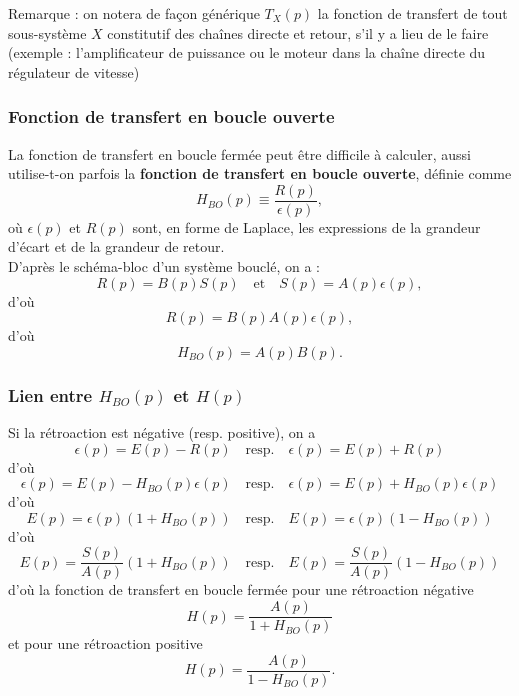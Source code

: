 \documentclass[11pt,a4paper]{report}
\begin{document}
Remarque : on notera de façon générique $T_X(p)$ la fonction de transfert de tout sous-système $X$ constitutif des chaînes directe et retour, s'il y a lieu de le faire (exemple : l'amplificateur de puissance ou le moteur dans la chaîne directe du régulateur de vitesse)

\subsubsection{Fonction de transfert en boucle ouverte}

La fonction de transfert en boucle fermée peut être difficile à calculer, aussi utilise-t-on parfois la \textbf{fonction de transfert en boucle ouverte}, définie comme
\begin{equation}
	H_{BO}(p) \equiv \frac{R(p)}{\epsilon(p)},
\end{equation}
où $\epsilon(p)$ et $R(p)$ sont, en forme de Laplace, les expressions de la grandeur d'écart et de la grandeur de retour.\\

D'après le schéma-bloc d'un système bouclé, on a :
\begin{equation}
	R(p) = B(p)S(p) \quad \text{et} \quad S(p) = A(p)\epsilon(p),
\end{equation}
d'où
\begin{equation}
	R(p) = B(p)A(p)\epsilon(p),
\end{equation}
d'où 
\begin{equation}
	 \boxed{H_{BO}(p) = A(p)B(p)}. 
\end{equation}

\subsubsection{Lien entre $H_{BO}(p)$ et $H(p)$}

Si la rétroaction est négative (resp. positive), on a 
\begin{equation}
	\epsilon(p) = E(p) - R(p) \quad\text{resp.}\quad \epsilon(p) = E(p) + R(p)
\end{equation}
d'où
\begin{equation}
	\epsilon(p) = E(p) - H_{BO}(p)\epsilon(p) \quad\text{resp.}\quad \epsilon(p) = E(p) + H_{BO}(p)\epsilon(p)
\end{equation}
d'où
\begin{equation}
	E(p) = \epsilon(p)\left(1 + H_{BO}(p)\right) \quad\text{resp.}\quad  E(p) = \epsilon(p)\left(1 - H_{BO}(p)\right)
\end{equation}
d'où
\begin{equation}
	E(p) = \frac{S(p)}{A(p)}\left(1 + H_{BO}(p)\right) \quad\text{resp.}\quad  E(p) = \frac{S(p)}{A(p)}\left(1 - H_{BO}(p)\right)
\end{equation}
d'où la fonction de transfert en boucle fermée pour une rétroaction négative
\begin{equation}
	 \boxed{H(p) = \frac{A(p)}{1+H_{BO}(p)}}
\end{equation}
et pour une rétroaction positive
\begin{equation}
	 \boxed{H(p) = \frac{A(p)}{1-H_{BO}(p)}}.
\end{equation}
\end{document}
